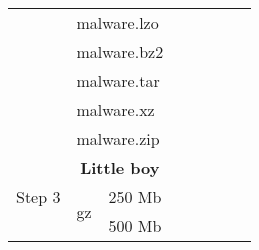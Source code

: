 \documentclass{article}           %
\begin{document}
\begin{table}[]
\begin{tabular}{lllccccc}
\multicolumn{1}{|l|}{}                               & \multicolumn{2}{l|}{malware.lzo}                                        & \multicolumn{1}{c|}{}       & \multicolumn{1}{c|}{}       & \multicolumn{1}{c|}{}           & \multicolumn{1}{c|}{}      & \multicolumn{1}{c|}{}        \\ \cline{2-8} 
\multicolumn{1}{|l|}{}                               & \multicolumn{2}{l|}{malware.bz2}                                        & \multicolumn{1}{c|}{}       & \multicolumn{1}{c|}{}       & \multicolumn{1}{c|}{}           & \multicolumn{1}{c|}{}      & \multicolumn{1}{c|}{}        \\ \cline{2-8} 
\multicolumn{1}{|l|}{}                               & \multicolumn{2}{l|}{malware.tar}                                        & \multicolumn{1}{c|}{}       & \multicolumn{1}{c|}{}       & \multicolumn{1}{c|}{}           & \multicolumn{1}{c|}{}      & \multicolumn{1}{c|}{}        \\ \cline{2-8} 
\multicolumn{1}{|l|}{}                               & \multicolumn{2}{l|}{malware.xz}                                         & \multicolumn{1}{c|}{}       & \multicolumn{1}{c|}{}       & \multicolumn{1}{c|}{}           & \multicolumn{1}{c|}{}      & \multicolumn{1}{c|}{}        \\ \cline{2-8} 
\multicolumn{1}{|l|}{}                               & \multicolumn{2}{l|}{malware.zip}                                        & \multicolumn{1}{c|}{}       & \multicolumn{1}{c|}{}       & \multicolumn{1}{c|}{}           & \multicolumn{1}{c|}{}      & \multicolumn{1}{c|}{}        \\ \hline
\multicolumn{1}{|l|}{\multirow{29}{*}{Step 3}}       & \multicolumn{2}{c|}{\textbf{Little boy}}                                & \multicolumn{5}{c|}{}                                                                                                                                   \\ \cline{2-8} 
\multicolumn{1}{|l|}{}                               & \multicolumn{1}{l|}{\multirow{4}{*}{gz}}  & \multicolumn{1}{l|}{250 Mb} & \multicolumn{1}{c|}{}       & \multicolumn{1}{c|}{}       & \multicolumn{1}{c|}{}           & \multicolumn{1}{c|}{}      & \multicolumn{1}{c|}{}        \\ \cline{3-8} 
\multicolumn{1}{|l|}{}                               & \multicolumn{1}{l|}{}                     & \multicolumn{1}{l|}{500 Mb} & \multicolumn{1}{c|}{}       & \multicolumn{1}{c|}{}       & \multicolumn{1}{c|}{}           & \multicolumn{1}{c|}{}      & \multicolumn{1}{c|}{}        \\ \cline{3-8} 

\end{tabular}
\end{table}
\end{document}
